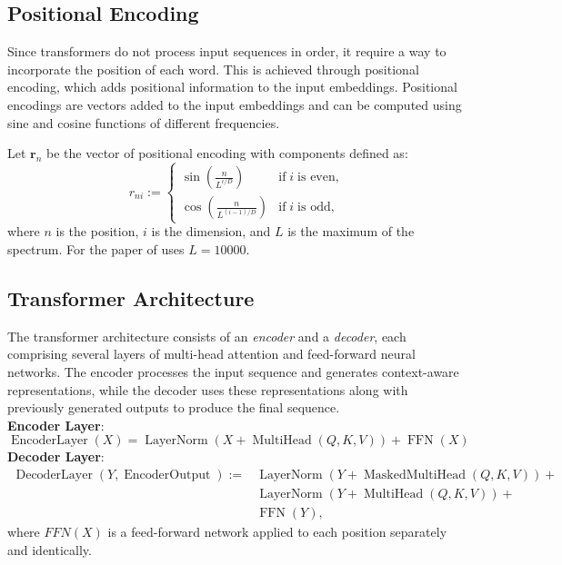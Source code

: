 \subsection{Positional Encoding}
Since transformers do not process input sequences in order, it require a way to incorporate the position of each word. This is achieved through positional encoding, which adds positional information to the input embeddings. Positional encodings are vectors added to the input embeddings and can be computed using sine and cosine functions of different frequencies.
\begin{defn}
    Let $\mathbf{r}_n$ be the vector of positional encoding with components defined as:
    \begin{equation}
        r_{ni}:=\begin{cases}
            \sin\left(\displaystyle\frac{n}{L^{i/D}}\right)&\text{if}\;i\;\text{is even,}\\
            \cos\left(\displaystyle\frac{n}{L^{(i-1)/D}}\right)&\text{if}\;i\;\text{is odd},
        \end{cases}
    \end{equation}
    where $n$ is the position, $i$ is the dimension, and $L$ is the maximum of the spectrum. For the paper of  uses $L=10000$.
\end{defn}
\subsection{Transformer Architecture}
The transformer architecture consists of an \textit{encoder} and a \textit{decoder}, each comprising several layers of multi-head attention and feed-forward neural networks. The encoder processes the input sequence and generates context-aware representations, while the decoder uses these representations along with previously generated outputs to produce the final sequence.\\
\textbf{Encoder Layer}:
\begin{equation}
    \operatorname{EncoderLayer}(X)=\operatorname{LayerNorm}(X+\operatorname{MultiHead}(Q,K,V))+\operatorname{FFN}(X)\nonumber
\end{equation}
\textbf{Decoder Layer}:
\begin{align}
    \operatorname{DecoderLayer}(Y,\operatorname{EncoderOutput}):=&\operatorname{LayerNorm}(Y+\operatorname{MaskedMultiHead}(Q,K,V))+\nonumber\\
    &\operatorname{LayerNorm}(Y+\operatorname{MultiHead}(Q,K,V))+\\
    &\operatorname{FFN}(Y)\nonumber,
\end{align}
where $FFN(X)$ is a feed-forward network applied to each position separately and identically.


